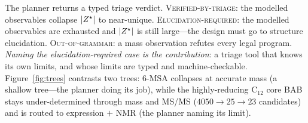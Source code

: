 The planner returns a typed triage verdict. \textsc{Verified-by-triage}: the modelled observables
collapse $|Z^{\star}|$ to near-unique. \textsc{Elucidation-required}: the modelled observables are
exhausted and $|Z^{\star}|$ is still large---the design must go to structure elucidation.
\textsc{Out-of-grammar}: a mass observation refutes every legal program. \emph{Naming the
elucidation-required case is the contribution}: a triage tool that knows its own limits, and whose limits
are typed and machine-checkable. Figure~\ref{fig:trees} contrasts two trees: 6-MSA collapses at accurate
mass (a shallow tree---the planner doing its job), while the highly-reducing C$_{12}$ core BAB stays
under-determined through mass and MS/MS ($4050\!\to\!25\!\to\!23$ candidates) and is routed to expression
$+$ NMR (the planner naming its limit).

